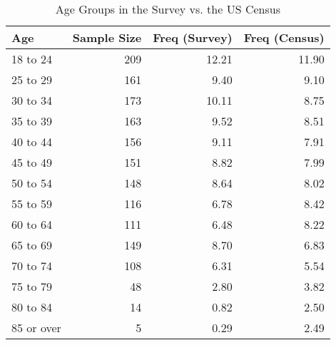 \begin{table}[th!]
\centering
\caption{Age Groups in the Survey vs. the US Census}
\label{tab-02-census-age.tex}
\begin{tabular}{lrrr}
\toprule
       Age &  Sample Size &  Freq (Survey) &  Freq (Census) \\
\midrule
  18 to 24 &          209 &          12.21 &          11.90 \\
  25 to 29 &          161 &           9.40 &           9.10 \\
  30 to 34 &          173 &          10.11 &           8.75 \\
  35 to 39 &          163 &           9.52 &           8.51 \\
  40 to 44 &          156 &           9.11 &           7.91 \\
  45 to 49 &          151 &           8.82 &           7.99 \\
  50 to 54 &          148 &           8.64 &           8.02 \\
  55 to 59 &          116 &           6.78 &           8.42 \\
  60 to 64 &          111 &           6.48 &           8.22 \\
  65 to 69 &          149 &           8.70 &           6.83 \\
  70 to 74 &          108 &           6.31 &           5.54 \\
  75 to 79 &           48 &           2.80 &           3.82 \\
  80 to 84 &           14 &           0.82 &           2.50 \\
85 or over &            5 &           0.29 &           2.49 \\
\bottomrule
\end{tabular}
\end{table}
